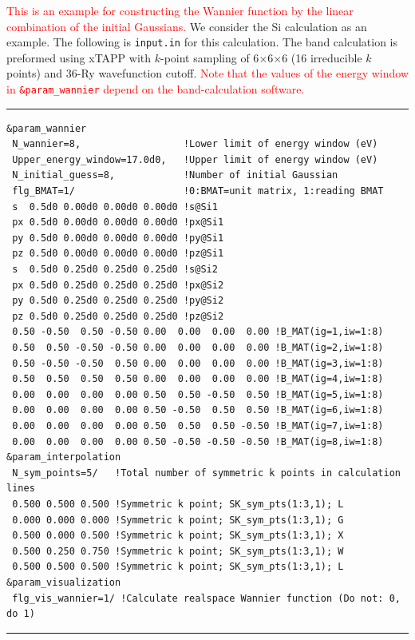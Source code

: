 \documentclass{article}
\newcommand{\tr}[1]{\textcolor{red}{#1}}
\begin{document}
\tr{This is an example for constructing the Wannier function by the linear combination of the initial Gaussians.} We consider the Si calculation as an example. The following is \verb+input.in+ for this calculation. The band calculation is preformed using {\sc xTAPP} with $k$-point sampling of 6$\times$6$\times$6 (16 irreducible $k$ points) and 36-Ry wavefunction cutoff. \tr{Note that the values of the energy window in {\tt \&param\_wannier} depend on the band-calculation software.}
\vspace{3mm}\hrule
\begin{verbatim}
&param_wannier 
 N_wannier=8,                  !Lower limit of energy window (eV)
 Upper_energy_window=17.0d0,   !Upper limit of energy window (eV)
 N_initial_guess=8,            !Number of initial Gaussian
 flg_BMAT=1/                   !0:BMAT=unit matrix, 1:reading BMAT      
 s  0.5d0 0.00d0 0.00d0 0.00d0 !s@Si1
 px 0.5d0 0.00d0 0.00d0 0.00d0 !px@Si1
 py 0.5d0 0.00d0 0.00d0 0.00d0 !py@Si1
 pz 0.5d0 0.00d0 0.00d0 0.00d0 !pz@Si1
 s  0.5d0 0.25d0 0.25d0 0.25d0 !s@Si2
 px 0.5d0 0.25d0 0.25d0 0.25d0 !px@Si2
 py 0.5d0 0.25d0 0.25d0 0.25d0 !py@Si2
 pz 0.5d0 0.25d0 0.25d0 0.25d0 !pz@Si2
 0.50 -0.50  0.50 -0.50 0.00  0.00  0.00  0.00 !B_MAT(ig=1,iw=1:8)
 0.50  0.50 -0.50 -0.50 0.00  0.00  0.00  0.00 !B_MAT(ig=2,iw=1:8)
 0.50 -0.50 -0.50  0.50 0.00  0.00  0.00  0.00 !B_MAT(ig=3,iw=1:8)
 0.50  0.50  0.50  0.50 0.00  0.00  0.00  0.00 !B_MAT(ig=4,iw=1:8)
 0.00  0.00  0.00  0.00 0.50  0.50 -0.50  0.50 !B_MAT(ig=5,iw=1:8)
 0.00  0.00  0.00  0.00 0.50 -0.50  0.50  0.50 !B_MAT(ig=6,iw=1:8)
 0.00  0.00  0.00  0.00 0.50  0.50  0.50 -0.50 !B_MAT(ig=7,iw=1:8)
 0.00  0.00  0.00  0.00 0.50 -0.50 -0.50 -0.50 !B_MAT(ig=8,iw=1:8)
&param_interpolation   
 N_sym_points=5/   !Total number of symmetric k points in calculation lines
 0.500 0.500 0.500 !Symmetric k point; SK_sym_pts(1:3,1); L
 0.000 0.000 0.000 !Symmetric k point; SK_sym_pts(1:3,1); G
 0.500 0.000 0.500 !Symmetric k point; SK_sym_pts(1:3,1); X
 0.500 0.250 0.750 !Symmetric k point; SK_sym_pts(1:3,1); W
 0.500 0.500 0.500 !Symmetric k point; SK_sym_pts(1:3,1); L
&param_visualization   
 flg_vis_wannier=1/ !Calculate realspace Wannier function (Do not: 0, do 1)  
\end{verbatim}
\hrule\vspace{3mm}
\end{document}
